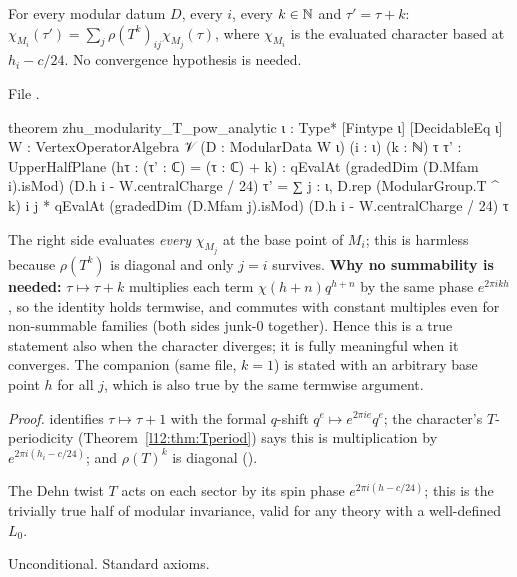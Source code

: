\begin{theorem}\label{l14:thm:Tanalytic}
For every modular datum $D$, every $i$, every $k\in{\mathbb{N}}$ and $\tau'=\tau+k$:
$\chi_{M_i}(\tau') = \sum_j\rho(T^k)_{ij}\chi_{M_j}(\tau)$, where $\chi_{M_i}$ is the evaluated character based at
$h_i - c/24$. No convergence hypothesis is needed.
\end{theorem}
\noindent File .
\begin{leancode}
theorem zhu_modularity_T_pow_analytic {ι : Type*} [Fintype ι] [DecidableEq ι]
    {W : VertexOperatorAlgebra 𝒱} (D : ModularData W ι) (i : ι) (k : ℕ)
    {τ τ' : UpperHalfPlane} (hτ : (τ' : ℂ) = (τ : ℂ) + k) :
    qEvalAt (gradedDim (D.Mfam i).isMod) (D.h i - W.centralCharge / 24) τ'
      = ∑ j : ι, D.rep (ModularGroup.T ^ k) i j
          * qEvalAt (gradedDim (D.Mfam j).isMod) (D.h i - W.centralCharge / 24) τ
\end{leancode}
\begin{dictionary}
The right side evaluates \emph{every} $\chi_{M_j}$ at the base point of $M_i$; this is harmless because $\rho(T^k)$ is
diagonal and only $j=i$ survives. \textbf{Why no summability is needed:} $\tau\mapsto\tau+k$ multiplies each term
$\chi(h+n)q^{h+n}$ by the same phase $e^{2\pi ikh}$, so the identity holds termwise, and  commutes with constant
multiples even for non-summable families (both sides junk-$0$ together). Hence this is a true statement also when the
character diverges; it is fully meaningful when it converges. The companion  (same file, $k=1$)
is stated with an arbitrary base point $h$ for all $j$, which is also true by the same termwise argument.
\end{dictionary}
\noindent\emph{Proof.}  identifies $\tau\mapsto\tau+1$ with the formal $q$-shift $q^e\mapsto
e^{2\pi ie}q^e$; the character's $T$-periodicity (Theorem~\ref{l12:thm:Tperiod}) says this is multiplication by
$e^{2\pi i(h_i-c/24)}$; and $\rho(T)^k$ is diagonal ().
\begin{physics}
The Dehn twist $T$ acts on each sector by its spin phase $e^{2\pi i(h-c/24)}$; this is the trivially true half of modular
invariance, valid for any theory with a well-defined $L_0$.
\end{physics}
\begin{status}
Unconditional. Standard axioms.
\end{status}


